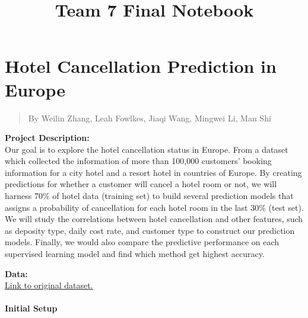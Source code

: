 \documentclass[11pt]{article}
\title{Team 7 Final Notebook}
\begin{document}
    
    \maketitle
    
    

    
    \hypertarget{hotel-cancellation-prediction-in-europe}{%
\section{Hotel Cancellation Prediction in
Europe}\label{hotel-cancellation-prediction-in-europe}}

    \begin{quote}
By Weilin Zhang, Leah Fowlkes, Jiaqi Wang, Mingwei Li, Man Shi
\end{quote}

    \textbf{Project Description:}\\
Our goal is to explore the hotel cancellation status in Europe. From a
dataset which collected the information of more than 100,000 customers'
booking information for a city hotel and a resort hotel in countries of
Europe. By creating predictions for whether a customer will cancel a
hotel room or not, we will harness 70\% of hotel data (training set) to
build several prediction models that assigns a probability of
cancellation for each hotel room in the last 30\% (test set). We will
study the correlations between hotel cancellation and other features,
such as deposity type, daily cost rate, and customer type to construct
our prediction models. Finally, we would also compare the predictive
performance on each supervised learning model and find which method get
highest accuracy.

\textbf{Data:}\\
\href{https://www.kaggle.com/jessemostipak/hotel-booking-demand}{Link to
original dataset.}

    \hypertarget{initial-setup}{%
\paragraph{Initial Setup}\label{initial-setup}}
\end{document}
